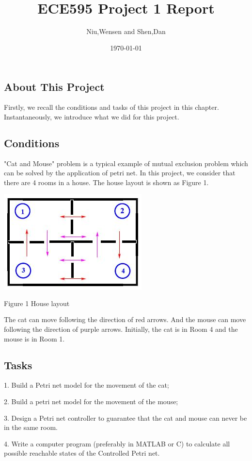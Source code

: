 \documentclass[11pt]{article}
\begin{document}
\tableofcontents

\title{ECE595 Project 1 Report}
\author{Niu,Wensen and Shen,Dan}
\date{\today}
\maketitle
\begin{flushleft}
\section{About This Project}
	Firstly, we recall the conditions and tasks of this project in this chapter. Instantaneously, we introduce what we did for this project.
	\subsection{Conditions}
	"Cat and Mouse" problem is a typical example of mutual exclusion problem which can be solved by the application of petri net. In this project, we consider that there are 4 rooms in a house. The house layout is shown as Figure 1.
	\begin{center}
	\includegraphics[]{houselayout.JPG}
	
	Figure 1 House layout
	\end{center}
	The cat can move following the direction of red arrows. And the mouse can move following the direction of purple arrows. Initially, the cat is in Room 4 and the mouse is in Room 1.
	
	\subsection{Tasks}
	1. Build a Petri net model for the movement of the cat;
	
	2. Build a petri net model for the movement of the mouse;
	
	3. Design a Petri net controller to guarantee that the cat and mouse can never be in the same room.
	
	4. Write a computer program (preferably in MATLAB or C) to calculate all possible reachable states of the Controlled Petri net.
		

\end{flushleft}
\end{document}
